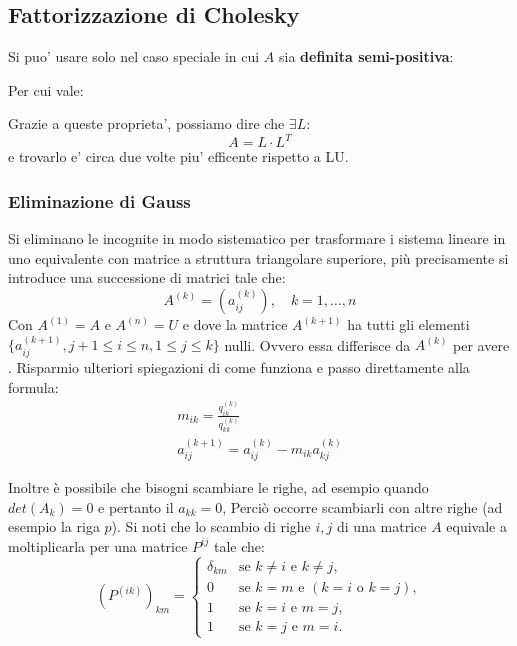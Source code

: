 \subsection{Fattorizzazione di Cholesky}
Si puo' usare solo nel caso speciale in cui $ A $ sia \textbf{definita semi-positiva}:

Per cui vale:

Grazie a queste proprieta', possiamo dire che $ \exists L: $
\[
A = L \cdot L^T
\]
e trovarlo e' circa due volte piu' efficente rispetto a LU.



\subsubsection{Eliminazione di Gauss}

Si eliminano le incognite in modo sistematico per trasformare i sistema lineare in uno equivalente con matrice a struttura triangolare superiore, più precisamente si introduce una successione di matrici tale che:
\[
            A^{(k)} = (a_{ij}^{(k)}), \quad k = 1,\dots,n
\]
Con $A^{(1)} = A$ e $A^{(n)} = U$ e dove la matrice $A^{(k+1)}$ ha tutti gli elementi $\{a_{ij}^{(k+1)}, j+1 \leq i\leq n, 1\leq j \leq k\}$ nulli. Ovvero essa differisce da $A^{(k)}$ per avere . Risparmio ulteriori spiegazioni di come funziona e passo direttamente alla formula:
\[
    \begin{array}{l}
        m_{ik} = \frac{q_{ik} ^ {(k)}}{q_{kk} ^ {(k)}} \\
        a_{ij}^{(k+1)} = a_{ij}^{(k)} - m_{ik} a_{kj} ^ {(k)}
    \end{array}
\]

Inoltre è possibile che bisogni scambiare le righe, ad esempio quando $det(A_k) = 0$ e pertanto il $a_{kk} = 0$, Perciò occorre scambiarli con altre righe (ad esempio la riga $p$). Si noti che lo scambio di righe $i,j$ di una matrice $A$ equivale a moltiplicarla per una matrice $P^{ij}$ tale che:
\[
    (P^{(ik)})_{km} =
    \begin{cases} 
    \delta_{km} & \text{se } k \neq i \text{ e } k \neq j, \\ 
    0 & \text{se } k = m \text{ e } (k = i \text{ o } k = j), \\ 
    1 & \text{se } k = i \text{ e } m = j, \\ 
    1 & \text{se } k = j \text{ e } m = i.
    \end{cases}
\]


